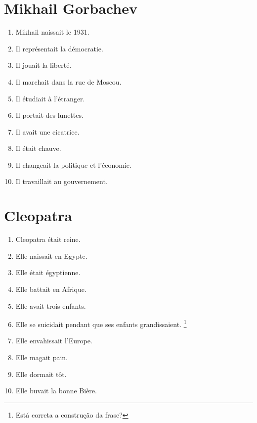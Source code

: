 \section*{Mikhail Gorbachev}

\begin{enumerate}
    \item Mikhail naissait le 1931.                    
    \item Il représentait la démocratie.                         
    \item Il jouait la liberté.             
    \item Il marchait dans la rue de Moscou.                
    \item Il étudiait à l'étranger.        
    \item Il portait des lunettes.      
    \item Il avait une cicatrice.
    \item Il était chauve.               
    \item Il changeait la politique et l'économie.          
    \item Il travaillait au gouvernement.             
\end{enumerate}

\section*{Cleopatra}

\begin{enumerate}
    \item Cleopatra était reine.
    \item Elle naissait en Egypte.
    \item Elle était égyptienne.
    \item Elle battait en Afrique.
    \item Elle avait trois enfants.
    \item Elle se suicidait pendant que ses enfants grandissaient. \footnote{Está correta a construção da frase?}
    \item Elle envahissait l'Europe.
    \item Elle magait pain.
    \item Elle dormait tôt.
    \item Elle buvait la bonne Bière. 
\end{enumerate}